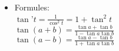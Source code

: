 \documentclass{article}
\begin{document}
\begin{itemize}
\begin{itemize}
		\item Formules: \\
		$\tan$'$ t = \frac{1}{\cos^2 t} = 1 + \tan^2 t$ \\
		$\tan (a+b) = \frac{\tan a + \tan b}{1 - \tan a\tan b}$ \\
		$\tan (a-b) = \frac{\tan a - \tan b}{1 + \tan a\tan b}$ \\
	\end{itemize}

\end{itemize}
\end{document}
